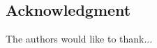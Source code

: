 \documentclass[conference]{IEEEtran}
\begin{document}
\subsection*{Acknowledgment}\label{sec:acknowledgment}
The authors would like to thank...



\end{document}
